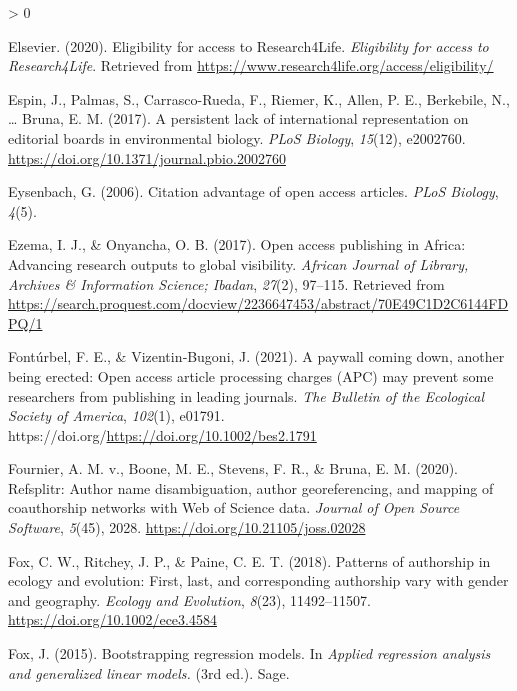 \documentclass[
  english,
  man]{apa6}
\newlength{\cslhangindent}
\newenvironment{CSLReferences}[2] %
 {%
  \setlength{\parindent}{0pt}
  \ifodd #1 \everypar{\setlength{\hangindent}{\cslhangindent}}\ignorespaces\fi
  \ifnum #2 > 0
  \setlength{\parskip}{#2\baselineskip}
  \fi
 }%
 {}
\begin{document}
\begin{CSLReferences}{1}{0}
\leavevmode\hypertarget{ref-elsevier_eligibility_2020}{}%
Elsevier. (2020). Eligibility for access to {Research4Life}. \emph{Eligibility for access to Research4Life}. Retrieved from \url{https://www.research4life.org/access/eligibility/}

\leavevmode\hypertarget{ref-espin_persistent_2017}{}%
Espin, J., Palmas, S., Carrasco-Rueda, F., Riemer, K., Allen, P. E., Berkebile, N., \ldots{} Bruna, E. M. (2017). A persistent lack of international representation on editorial boards in environmental biology. \emph{PLoS Biology}, \emph{15}(12), e2002760. \url{https://doi.org/10.1371/journal.pbio.2002760}

\leavevmode\hypertarget{ref-eysenbach_citation_2006}{}%
Eysenbach, G. (2006). Citation advantage of open access articles. \emph{PLoS Biology}, \emph{4}(5).

\leavevmode\hypertarget{ref-ezema_open_2017}{}%
Ezema, I. J., \& Onyancha, O. B. (2017). Open access publishing in {Africa}: Advancing research outputs to global visibility. \emph{African Journal of Library, Archives \& Information Science; Ibadan}, \emph{27}(2), 97--115. Retrieved from \url{https://search.proquest.com/docview/2236647453/abstract/70E49C1D2C6144FDPQ/1}

\leavevmode\hypertarget{ref-fonturbel_paywall_2021}{}%
Fontúrbel, F. E., \& Vizentin‐Bugoni, J. (2021). A paywall coming down, another being erected: Open access article processing charges ({APC}) may prevent some researchers from publishing in leading journals. \emph{The Bulletin of the Ecological Society of America}, \emph{102}(1), e01791. https://doi.org/\url{https://doi.org/10.1002/bes2.1791}

\leavevmode\hypertarget{ref-fournier_refsplitr_2020}{}%
Fournier, A. M. v., Boone, M. E., Stevens, F. R., \& Bruna, E. M. (2020). Refsplitr: {Author} name disambiguation, author georeferencing, and mapping of coauthorship networks with {Web} of {Science} data. \emph{Journal of Open Source Software}, \emph{5}(45), 2028. \url{https://doi.org/10.21105/joss.02028}

\leavevmode\hypertarget{ref-fox_patterns_2018}{}%
Fox, C. W., Ritchey, J. P., \& Paine, C. E. T. (2018). Patterns of authorship in ecology and evolution: {First}, last, and corresponding authorship vary with gender and geography. \emph{Ecology and Evolution}, \emph{8}(23), 11492--11507. \url{https://doi.org/10.1002/ece3.4584}

\leavevmode\hypertarget{ref-fox_bootstrapping_2015}{}%
Fox, J. (2015). Bootstrapping regression models. In \emph{Applied regression analysis and generalized linear models.} (3rd ed.). Sage.


\end{CSLReferences}
\end{document}
